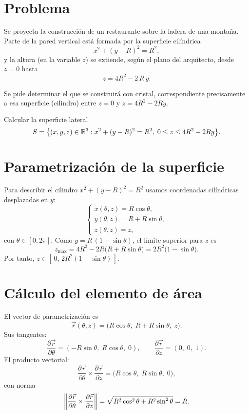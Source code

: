 \documentclass{claudeeditorial}
\begin{document}
\BodyCopy
\ClaudeCover


\section{Problema}

Se proyecta la construcción de un restaurante sobre la ladera de una montaña. Parte de la pared vertical está formada por la superficie cilíndrica
\[
  x^2 + (y - R)^2 = R^2,
\]
y la altura (en la variable $z$) se extiende, según el plano del arquitecto, desde $z=0$ hasta
\[
  z = 4R^2 - 2\,R\,y.
\]

Se pide determinar el  que se construirá con cristal, correspondiente precisamente a esa superficie (cilindro) entre $z=0$ y $z = 4R^2 - 2Ry$.

\begin{ClaudeInfo}[Objetivo]
Calcular la superficie lateral
\[
  S=\bigl\{(x,y,z)\in\R^3 : x^2+(y-R)^2=R^2,\; 0\le z\le 4R^2 -2Ry\bigr\}.
\]
\end{ClaudeInfo}

\section{Parametrización de la superficie}

Para describir el cilindro $x^2 + (y-R)^2 = R^2$ usamos coordenadas cilíndricas desplazadas en $y$:
\[
  \begin{cases}
    x(\theta,z) = R\cos\theta,\\
    y(\theta,z) = R + R\sin\theta,\\
    z(\theta,z) = z,
  \end{cases}
\]
con $\theta\in[0,2\pi]$. Como $y = R\,(1 + \sin\theta)$, el límite superior para $z$ es
\[
  z_{\max} = 4R^2 - 2R\bigl(R + R\sin\theta\bigr)
          = 2R^2\bigl(1 - \sin\theta\bigr).
\]
Por tanto, $z \in [\,0,\,2R^2(1 - \sin\theta)\,]$.

\section{Cálculo del elemento de área}

El vector de parametrización es
\[
  \vec{r}(\theta,z) = \bigl( R\cos\theta,\; R + R\sin\theta,\; z \bigr).
\]
Sus tangentes:
\[
  \frac{\partial \vec{r}}{\partial \theta}
  = (-R\sin\theta,\; R\cos\theta,\; 0),
  \qquad
  \frac{\partial \vec{r}}{\partial z}
  = (0,\;0,\;1).
\]
El producto vectorial:
\[
  \frac{\partial \vec{r}}{\partial \theta} \times \frac{\partial \vec{r}}{\partial z}
  = \bigl(R\cos\theta,\; R\sin\theta,\; 0\bigr),
\]
con norma
\[
  \norm*{\frac{\partial \vec{r}}{\partial \theta} \times \frac{\partial \vec{r}}{\partial z}}
  = \sqrt{R^2\cos^2\theta + R^2\sin^2\theta} = R.
\]
\end{document}
